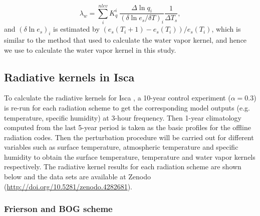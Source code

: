 \begin{equation}
\lambda_w = \sum_i^{nlev} K^i_q ~\frac{\Delta \ln q_i}{(\delta \ln e_s/ \delta T)_i} \frac{1}{\Delta T_s},
\label{eq:fb_wv_YHuang}
\end{equation}
and $(\delta \ln e_s)_i$ is estimated by $\left(e_s(T_i+1)-e_s(T_i)\right)/ e_s(T_i)$, which is similar to the method that \cite{Pendergrass2018} used to calculate the water vapor kernel, and hence we use  to calculate the water vapor kernel in this study.

\subsection{Radiative kernels in Isca}
 
To calculate the radiative kernels for Isca , a 10-year control experiment ($\alpha= 0.3$) is re-run for each radiation scheme to get the corresponding model outputs (e.g. temperature, specific humidity) at 3-hour frequency. Then 1-year climatology computed from the last 5-year period is taken as the basic profiles for the offline radiation codes. Then the perturbation procedure will be carried out for different variables such as surface temperature, atmospheric temperature and specific humidity to obtain the surface temperature, temperature and water vapor kernels respectively. The radiative kernel results for each radiation scheme are shown below and the data sets are available at Zenodo (\url{http://doi.org/10.5281/zenodo.4282681}).

\subsubsection{Frierson and BOG scheme}

